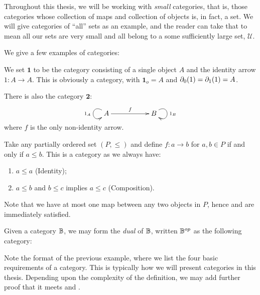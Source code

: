 Throughout   this thesis, we will be working with \emph{small} categories, that is, those categories
whose collection of maps and collection of objects is, in fact, a set. We will give categories of
``all'' sets as an example, and the reader can take that to mean all our sets are very small and all
belong to a some sufficiently large set, $\mathcal{U}$.

We give a few examples of categories:

\begin{example}\label{ex:small_finite_categories}
  We set $\mathbf{1}$ to be the category consisting of a single object $A$ and the identity arrow
  $1:A\to A$. This  is obviously a category, with $\mathbf{1}_o = A$ and
  $\partial_0({1}) = \partial_1({1}) = A$.

  There is also the category $\mathbf{2}$:
  \[
    \xymatrix{
      A\ar[rr]^{f} \ar@(ul,dl)[]_{1_A}& & B  \ar@(ur,dr)[]^{1_B}
    }
  \]
  where $f$ is the only non-identity arrow.
\end{example}

\begin{example}\label{ex:preorders-are-categories}
  Take any partially ordered set $(P,\le)$ and define $f:a \to b$ for $a,b\in P$ if and only if
  $a\le b$. This is a category as we always have:
  \begin{enumerate}[{(}i{)}]
  \item $a \le a$ (Identity);
  \item $a \le b$ and $b \le c$ implies $a\le c$ (Composition).
  \end{enumerate}
  Note that we have at most one map between any two objects in $P$, hence \catone and \cattwo are
  immediately satisfied.
\end{example}
\begin{example}\label{ex:dual_category}
Given a category $\mathbb{B}$, we may form the \emph{dual} of $\mathbb{B}$, written ${\mathbb{B}}^{op}$ as the following
category:
\end{example}

Note the format of the previous example, where we list the four basic requirements of a
category. This is typically how we will present categories in this thesis. Depending upon the
complexity of the definition, we may add further proof that it meets \catone and \cattwo.

